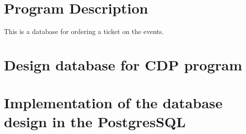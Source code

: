 \documentclass[10pt]{article}
\begin{document}
    \maketitle
    \newpage

    \section{Program Description}\label{sec:program-description}
    This is a database for ordering a ticket on the events.

    \section{Design database for CDP program}\label{sec:database-design}
    

    \section{Implementation of the database design in the PostgresSQL}\label{sec:posgresql-implementation}
    
\end{document}
